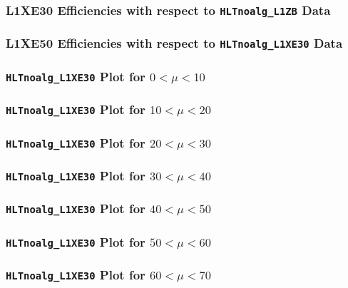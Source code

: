 \documentclass[draft]{beamer}
\begin{document}
\begin{frame}
        \frametitle{L1XE30 Efficiencies with respect to \texttt{HLTnoalg\_L1ZB} Data}
\end{frame}
\begin{frame}
        \frametitle{L1XE50 Efficiencies with respect to \texttt{HLTnoalg\_L1XE30} Data}
\end{frame}
\begin{frame}
        \frametitle{\texttt{HLTnoalg\_L1XE30} Plot for $0<\mu<10$}
\end{frame}
\begin{frame}
        \frametitle{\texttt{HLTnoalg\_L1XE30} Plot for $10<\mu<20$}
\end{frame}
\begin{frame}
        \frametitle{\texttt{HLTnoalg\_L1XE30} Plot for $20<\mu<30$}
\end{frame}
\begin{frame}
        \frametitle{\texttt{HLTnoalg\_L1XE30} Plot for $30<\mu<40$}
\end{frame}
\begin{frame}
        \frametitle{\texttt{HLTnoalg\_L1XE30} Plot for $40<\mu<50$}
\end{frame}
\begin{frame}
        \frametitle{\texttt{HLTnoalg\_L1XE30} Plot for $50<\mu<60$}
\end{frame}
\begin{frame}
        \frametitle{\texttt{HLTnoalg\_L1XE30} Plot for $60<\mu<70$}
\end{frame}
\end{document}
